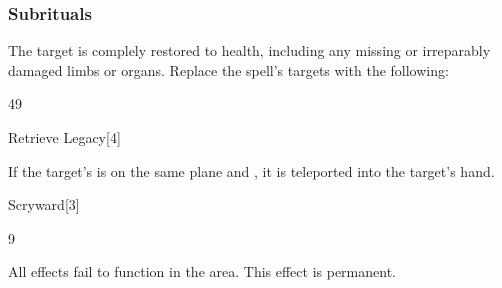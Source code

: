 \subsubsection{Subrituals}
The target is complely restored to health, including any missing or irreparably damaged limbs or organs.
Replace the spell's targets with the following:
\begin{spellcontent}
\begin{augmenttargetinginfo}
 49
\end{augmenttargetinginfo}
\end{spellcontent}
\begin{spellsection}{Retrieve Legacy}[4]
\begin{spellcontent}
\begin{spelltargetinginfo}
\end{spelltargetinginfo}
\begin{spelleffects}
\spelleffect
If the target's  is on the same plane and , it is teleported into the target's hand.
\end{spelleffects}
\end{spellcontent}
\begin{spellfooter}
\end{spellfooter}
\begin{spellsubcontent}
\end{spellsubcontent}
\end{spellsection}
\begin{spellsection}{Scryward}[3]
\begin{spellcontent}
\begin{spelltargetinginfo}
 9
\end{spelltargetinginfo}
\begin{spelleffects}
\spelleffect
All  effects fail to function in the area.
This effect is permanent.
\end{spelleffects}
\end{spellcontent}
\begin{spellfooter}
\end{spellfooter}
\begin{spellsubcontent}
\end{spellsubcontent}
\end{spellsection}
